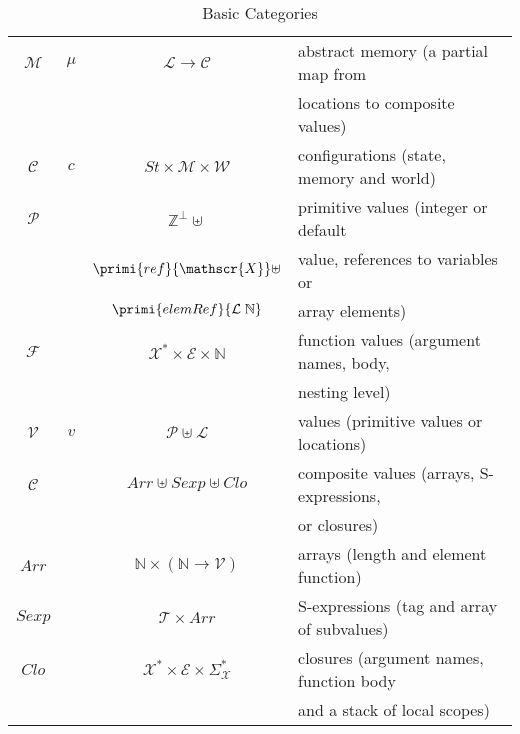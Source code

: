 \begin{table}[t]
\begin{tabular}{cccl}
    $\mathcal M$       & $\mu$                           & $\mathcal L\to\mathcal C$                               & abstract memory (a partial map from\\
                       &                                 &                                                         & locations to composite values) \\[1mm]
    $\mathcal C$       & $c$                             & $St\times\mathcal{M}\times\mathcal{W}$                  & configurations (state, memory and world)\\[2mm]
    $\mathcal P$       &                                 & $\mathbb Z^\bot\uplus$                                   & primitive values (integer or default\\
                       &                                 & $\primi{ref}{\mathscr{X}}\uplus$                        & value, references to variables or\\
                       &                                 & $\primi{elemRef}{\mathcal L\;\mathbb N}$                & array elements)\\[2mm]
    $\mathcal F$       &                                 & $\mathscr X^*\times\mathscr E \times \mathbb N$         & function values (argument names, body,\\
                       &                                 &                                                         & nesting level)\\[1mm]
    $\mathcal V$       & $v$                             & $\mathcal P\uplus \mathcal L$                           & values (primitive values or locations) \\[1mm]
    $\mathcal C$       &                                 & $Arr\uplus Sexp \uplus Clo$                             & composite values (arrays, S-expressions, \\
                       &                                 &                                                         & or closures) \\[1mm]
    $Arr$              &                                 & $\mathbb N\times (\mathbb N\to\mathcal V)$              & arrays (length and element function) \\[1mm]
    $Sexp$             &                                 & $\mathscr T \times Arr$                                 & S-expressions (tag and array of subvalues) \\[1mm]
    $Clo$              &                                 & $\mathscr X^* \times\mathscr E\times\Sigma^*_{\mathscr X}$ & closures (argument names, function body\\
                       &                                 &                                                         & and a stack of local scopes) 
  \end{tabular}
  \caption{Basic Categories}
  \label{categories}
\end{table}
